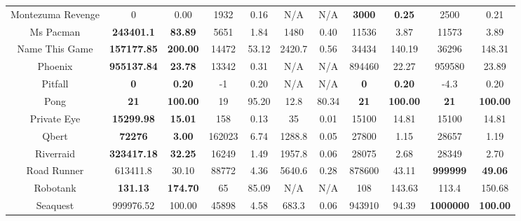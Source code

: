 \documentclass[nohyperref]{article}
\newcommand{\best}[1]{\textbf{#1}}
\theoremstyle{plain}
\begin{document}
\begin{table}[!hb]
\begin{center}
\begin{tabular}{|c |c c| c c| c c| c c| c c| }
 Montezuma Revenge  & 0                       & 0.00         & 1932              &0.16       &N/A       & N/A     & \best{3000}                & \best{0.25  }  &2500            &0.21\\
 Ms Pacman          & \textbf{243401.1 }      & \textbf{83.89   }  & 5651     &1.84       &1480      & 0.40    & 11536                         & 3.87           &11573           &3.89\\
 Name This Game     & \textbf{157177.85}      & \textbf{200.00  }  & 14472    &53.12          &2420.7    & 0.56    & 34434                     & 140.19         &36296           &148.31\\
 Phoenix            & \textbf{955137.84}      & \textbf{23.78   }  & 13342     &0.31       &N/A       & N/A     & 894460                        & 22.27         &959580          &23.89\\
 Pitfall            & \textbf{0}              & \textbf{0.20}               & -1                 &0.20       &N/A       & N/A     & \best{0}             & \best{0.20}   &-4.3            &0.20\\
 Pong               & \textbf{21}             & \textbf{100.00}             & 19                 &95.20          & 12.8     & 80.34   & \best{21}        & \best{100.00} &\textbf{21}   &\textbf{100.00}\\
 Private Eye        & \textbf{15299.98 }      & \textbf{15.01}     & 158       &0.13       & 35       & 0.01    & 15100                         & 14.81         &15100           &14.81\\
 Qbert              & \textbf{72276          }& \textbf{3.00}      & 162023    &6.74       & 1288.8   & 0.05    & 27800                         & 1.15          &28657           &1.19\\
 Riverraid          & \textbf{323417.18}      & \textbf{32.25}     & 16249    &1.49       & 1957.8   & 0.06    & 28075                         & 2.68           &28349           &2.70\\
 Road Runner        & 613411.8                & 30.10              & 88772             &4.36       & 5640.6   & 0.28       & 878600     & 43.11   &\textbf{999999}          &\textbf{49.06}\\
 Robotank           & \textbf{131.13}         & \textbf{174.70}    & 65        &85.09          & N/A      & N/A     & 108                       & 143.63        &113.4           &150.68\\
 Seaquest           & 999976.52               & 100.00             & 45898             &4.58       & 683.3             & 0.06 &943910	             &94.39&\textbf{1000000}          &\textbf{100.00}\\

\end{tabular}
\end{center}
\end{table}
\end{document}
